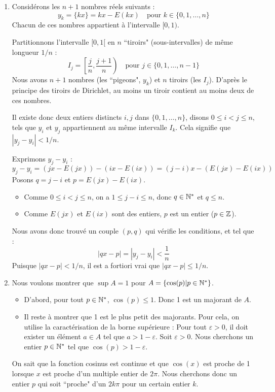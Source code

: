 \documentclass[solutions]{exercices}
\begin{document}
\begin{solution}
	\begin{enumerate}
		\item Considérons les $n+1$ nombres réels suivants :
		      \[ y_k = \{kx\} = kx - E(kx) \quad \text{pour } k \in \{0, 1, \dots, n\} \]
		      Chacun de ces nombres appartient à l'intervalle $[0, 1)$.

		      Partitionnons l'intervalle $[0,1[$ en $n$ ``tiroirs" (sous-intervalles) de même longueur $1/n$ :
		      \[ I_j = \left[\frac{j}{n}, \frac{j+1}{n}\right) \quad \text{pour } j \in \{0, 1, \dots, n-1\} \]
		      Nous avons $n+1$ nombres (les ``pigeons", $y_k$) et $n$ tiroirs (les $I_j$). D'après le principe des tiroirs de Dirichlet, au moins un tiroir contient au moins deux de ces nombres.

		      Il existe donc deux entiers distincts $i, j$ dans $\{0, 1, \dots, n\}$, disons $0 \leq i < j \leq n$, tels que $y_i$ et $y_j$ appartiennent au même intervalle $I_k$.
		      Cela signifie que $|y_j - y_i| < 1/n$.

		      Exprimons $y_j - y_i$ :
		      \[ y_j - y_i = (jx - E(jx)) - (ix - E(ix)) = (j-i)x - (E(jx)-E(ix)) \]
		      Posons $q = j-i$ et $p = E(jx)-E(ix)$.
		      \begin{itemize}
			      \item Comme $0 \leq i < j \leq n$, on a $1 \leq j-i \leq n$, donc $q \in \mathbb{N}^*$ et $q \leq n$.
			      \item Comme $E(jx)$ et $E(ix)$ sont des entiers, $p$ est un entier ($p \in \mathbb{Z}$).
		      \end{itemize}
		      Nous avons donc trouvé un couple $(p,q)$ qui vérifie les conditions, et tel que :
		      \[ |qx - p| = |y_j - y_i| < \frac{1}{n} \]
		      Puisque $|qx - p| < 1/n$, il est a fortiori vrai que $|qx - p| \leq 1/n$.

		\item Nous voulons montrer que $\sup A = 1$ pour $A = \{\cos(p)|p\in \mathbb{N}^*\}$.
		      \begin{itemize}
			      \item D'abord, pour tout $p \in \mathbb{N}^*$, $\cos(p) \leq 1$. Donc 1 est un majorant de $A$.
			      \item Il reste à montrer que 1 est le plus petit des majorants. Pour cela, on utilise la caractérisation de la borne supérieure :
			            Pour tout $\varepsilon > 0$, il doit exister un élément $a \in A$ tel que $a > 1-\varepsilon$.
			            Soit $\varepsilon > 0$. Nous cherchons un entier $p \in \mathbb{N}^*$ tel que $\cos(p) > 1-\varepsilon$.
		      \end{itemize}
		      On sait que la fonction cosinus est continue et que $\cos(x)$ est proche de 1 lorsque $x$ est proche d'un multiple entier de $2\pi$. Nous cherchons donc un entier $p$ qui soit ``proche" d'un $2k\pi$ pour un certain entier $k$.


\end{enumerate}
\end{solution}
\end{document}
